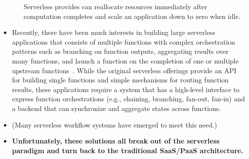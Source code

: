 \begin{itemize}
\begin{itemize}
      Serverless provides can reallocate resources immediately after
      computation completes and scale an application down to zero when idle.

    \end{itemize}

  \item Recently, there have been much interests in building large serverless
  applications that consists of multiple functions with complex orchestration
  patterns such as branching on function outputs, aggregating results over
  many functions, and launch a function on the completion of one or multiple
  upstream functions~\cite{excamera, kappa, pywren, google-workflows,
  durable-functions, gg-atc}. While the original serverless offerings provide
  an API for building single functions and simple mechanisms for routing
  function results, these applications require a system that has a high-level
  interface to express function orchestrations (e.g., chaining, branching,
  fan-out, fan-in) and a backend that can synchronize and aggregate states
  across functions.






  \item (Many serverless workflow systems have emerged to meet this need.)


  \item \textbf{Unfortunately, these solutions all break out of the serverless
  paradigm and turn back to the traditional SaaS/PaaS architecture.}


\end{itemize}
